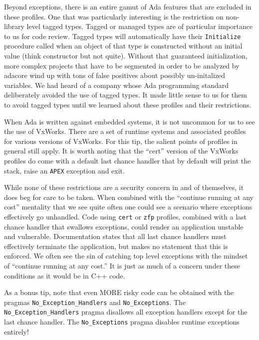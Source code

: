 Beyond exceptions, there is an entire gamut of Ada features that are excluded in these profiles.\autocite[§ 4.2.2]{20210809:gnathie} One that was particularly interesting is the restriction on non-library level tagged types. Tagged or managed types are of particular importance to us for code review. Tagged types will automatically have their \texttt{Initialize} procedure called when an object of that type is constructed without an initial value (think constructor but not quite).\autocite{20210809:adap} Without that guaranteed initialization, more complex projects that have to be segmented in order to be analyzed by adacore wind up with tons of false positives about possibly un-initalized variables. We had heard of a company whose Ada programming standard deliberately avoided the use of tagged types. It made little sense to us for them to avoid tagged types until we learned about these profiles and their restrictions.

When Ada is written against embedded systems, it is not uncommon for us to see the use of VxWorks. There are a set of runtime systems and associated profiles for various versions of VxWorks. For this tip, the salient points of profiles in general still apply. It is worth noting that the ``cert'' version of the VxWorks profiles do come with a default last chance handler that by default will print the stack, raise an \texttt{APEX} exception and exit.\autocite[§ A, Replacement of the Default Last Chance Handler]{20210809:gnatugx}

While none of these restrictions are a security concern in and of themselves, it does beg for care to be taken. When combined with the ``continue running at any cost'' mentality that we see quite often one could see a scenario where exceptions effectively go unhandled. Code using \texttt{cert} or \texttt{zfp} profiles, combined with a last chance handler that swallows exceptions, could render an application unstable and vulnerable. Documentation states that all last chance handlers must effectively terminate the application,\autocite[§ 3.1]{20210809:gnathie} but makes no statement that this is enforced. We often see the sin of catching top level exceptions\autocite[\pno~159]{20210809:viega200924} with the mindset of ``continue running at any cost.'' It is just as much of a concern under these conditions as it would be in C++ code.

As a bonus tip, note that even MORE risky code can be obtained with the pragmas \texttt{No\_Exception\_Handlers} and \texttt{No\_Exceptions}. The \texttt{No\_Exception\_Handlers} pragma disallows all exception handlers except for the last chance handler. The \texttt{No\_Exceptions} pragma disables runtime exceptions entirely!\autocite[§ 3.1]{20210809:gnathie}

